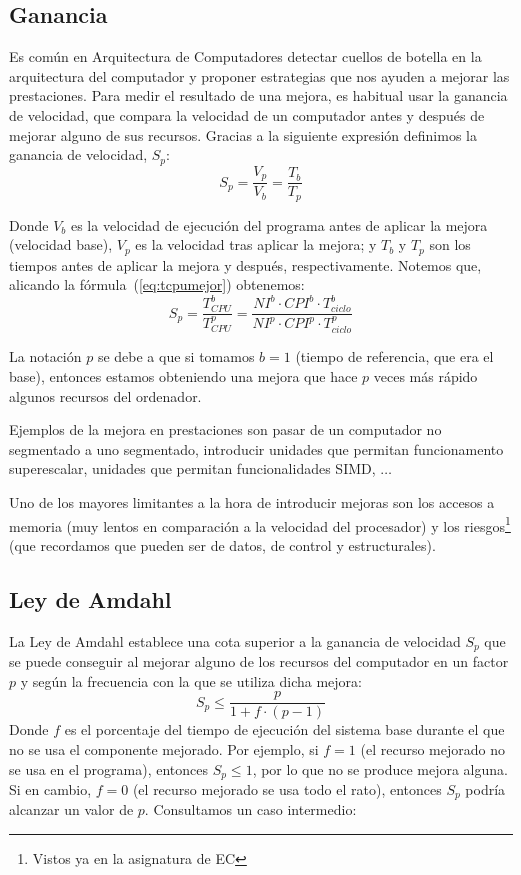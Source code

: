 \subsection{Ganancia}
Es común en Arquitectura de Computadores detectar cuellos de botella en la arquitectura del computador y proponer estrategias que nos ayuden a mejorar las prestaciones. Para medir el resultado de una mejora, es habitual usar la ganancia de velocidad, que compara la velocidad de un computador antes y después de mejorar alguno de sus recursos. Gracias a la siguiente expresión definimos la ganancia de velocidad, $S_p$:
\begin{equation}
    S_p = \dfrac{V_p}{V_b} = \dfrac{T_b}{T_p}
\end{equation}

Donde $V_b$ es la velocidad de ejecución del programa antes de aplicar la mejora (velocidad base), $V_p$ es la velocidad tras aplicar la mejora; y $T_b$ y $T_p$ son los tiempos antes de aplicar la mejora y después, respectivamente. Notemos que, alicando la fórmula~(\ref{eq:tcpumejor}) obtenemos:
\begin{equation}
    S_p = \dfrac{T^b_{CPU}}{T^p_{CPU}} = \dfrac{NI^b \cdot CPI^b \cdot T^b_{ciclo}}{NI^p \cdot CPI^p \cdot T^p_{ciclo}}
\end{equation}

La notación $p$ se debe a que si tomamos $b = 1$ (tiempo de referencia, que era el base), entonces estamos obteniendo una mejora que hace $p$ veces más rápido algunos recursos del ordenador.

Ejemplos de la mejora en prestaciones son pasar de un computador no segmentado a uno segmentado, introducir unidades que permitan funcionamento superescalar, unidades que permitan funcionalidades SIMD, $\ldots$

Uno de los mayores limitantes a la hora de introducir mejoras son los accesos a memoria (muy lentos en comparación a la velocidad del procesador) y los riesgos\footnote{Vistos ya en la asignatura de EC} (que recordamos que pueden ser de datos, de control y estructurales).

\subsection{Ley de Amdahl}
La Ley de Amdahl establece una cota superior a la ganancia de velocidad $S_p$ que se puede conseguir al mejorar alguno de los recursos del computador en un factor $p$ y según la frecuencia con la que se utiliza dicha mejora:
\begin{equation}
    S_p \leq \dfrac{p}{1+f\cdot (p-1)}
\end{equation}
Donde $f$ es el porcentaje del tiempo de ejecución del sistema base durante el que no se usa el componente mejorado. Por ejemplo, si $f = 1$ (el recurso mejorado no se usa en el programa), entonces $S_p \leq 1$, por lo que no se produce mejora alguna. Si en cambio, $f = 0$ (el recurso mejorado se usa todo el rato), entonces $S_p$ podría alcanzar un valor de $p$. Consultamos un caso intermedio:

